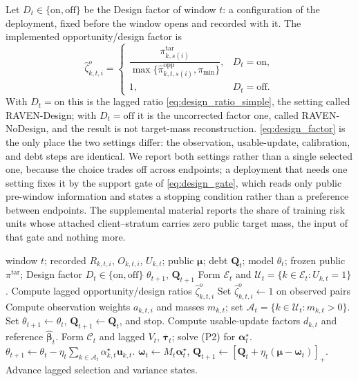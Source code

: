 \documentclass[letterpaper,journal]{IEEEtran}
\begin{document}
Let $D_t\in\{\mathrm{on},\mathrm{off}\}$ be the Design factor of window $t$:
a configuration of the deployment, fixed before the window opens and recorded
with it.  The implemented opportunity/design factor is
\begin{equation}
\widehat\zeta^{o}_{k,t,i}
=
\begin{cases}
\dfrac{\pi^{\mathrm{tar}}_{k,s(i)}}
{\max\{\widehat\pi^{\mathrm{opp}}_{k,t,s(i)},\pi_{\min}\}}, & D_t=\mathrm{on},\\[1.5mm]
1, & D_t=\mathrm{off}.
\end{cases}
\label{eq:design_factor}
\end{equation}
With $D_t=\mathrm{on}$ this is the lagged ratio
\eqref{eq:design_ratio_simple}, the setting called RAVEN-Design; with
$D_t=\mathrm{off}$ it is the uncorrected factor one, called RAVEN-NoDesign,
and the result is not target-mass reconstruction.
\eqref{eq:design_factor} is the only place the two settings differ: the
observation, usable-update, calibration, and debt steps are identical.
We report both settings rather than a single selected one, because the choice
trades off across endpoints; a deployment that needs one setting fixes it by the
support gate of \eqref{eq:design_gate}, which reads only public pre-window
information and states a stopping condition rather than a preference between
endpoints.  The supplemental material reports the share of training risk units
whose attached client--stratum carries zero public target mass, the input of that
gate and nothing more.

\begin{algorithm}[t]
\caption{Window-close RAVEN-MCS with the Design factor as an explicit configuration}
\label{alg:window_close}
\begin{algorithmic}[1]
\REQUIRE window $t$; recorded $R_{k,t,i}$, $O_{k,t,i}$, $U_{k,t}$;
public $\boldsymbol\mu$; debt $\mathbf{Q}_t$; model $\theta_t$;
frozen public $\pi^{\mathrm{tar}}$; Design factor $D_t\in\{\mathrm{on},\mathrm{off}\}$
\ENSURE $\theta_{t+1}$, $\mathbf{Q}_{t+1}$
\STATE Form $\mathcal{E}_t$ and
$\mathcal{U}_t=\{k\in\mathcal{E}_t:U_{k,t}=1\}$.
\STATE Compute lagged opportunity/design ratios
$\widehat\zeta^{o}_{k,t,i}$ 
\ELSE
\STATE Set $\widehat\zeta^{o}_{k,t,i}\leftarrow 1$ on observed pairs 
\ENDIF
\STATE Compute observation weights $a_{k,t,i}$ and masses $m_{k,t}$;
set $\mathcal{A}_t=\{k\in\mathcal{U}_t:m_{k,t}>0\}$.
\STATE Set $\theta_{t+1}\leftarrow\theta_t$,
$\mathbf{Q}_{t+1}\leftarrow\mathbf{Q}_t$, and stop.
\ELSE
\STATE Compute usable-update factors $d_{k,t}$ and reference
$\widehat{\boldsymbol\beta}_t$.
\STATE Form $\mathcal{C}_t$ and lagged $V_t$,
$\overline{\boldsymbol\tau}_t$; solve (P2) for
$\boldsymbol\alpha_t^\star$.
\STATE $\theta_{t+1}\leftarrow\theta_t
-\eta_t\sum_{k\in\mathcal{A}_t}\alpha^\star_{k,t}\mathbf{u}_{k,t}$.
\STATE $\boldsymbol\omega_t\leftarrow M_t\boldsymbol\alpha_t^\star$,
$\mathbf{Q}_{t+1}\leftarrow
[\mathbf{Q}_t+\eta_t(\boldsymbol\mu-\boldsymbol\omega_t)]_+$.
\STATE Advance lagged selection and variance states.
\ENDIF
\end{algorithmic}
\end{algorithm}
\end{document}
